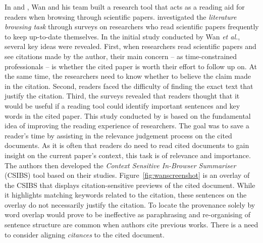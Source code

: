 In \cite{citation-sensitive} and \cite{csibs}, Wan and his team built a research tool that acts as a reading aid for readers when browsing through scientific papers.  investigated the \textit{literature browsing task} through surveys on researchers who read scientific papers frequently to keep up-to-date themselves. In the initial study conducted by Wan {\it et al.}, several key ideas were revealed. First, when researchers read scientific papers and see citations made by the author, their main concern -- as time-constrained professionals -- is whether the cited paper is worth their effort to follow up on. At the same time, the researchers need to know whether to believe the claim made in the citation. Second, readers faced the difficulty of finding the exact text that justify the citation. Third, the surveys revealed that readers thought that it would be  useful if a reading tool could identify important sentences and key words in the cited paper. This study conducted by  is based on the fundamental idea of improving the reading experience of researchers. The goal was to save a reader's time by assisting in the relevance judgement process on the cited documents. As it is often that readers do need to read cited documents to gain insight on the current paper's context, this task is of relevance and importance. The authors then developed the {\it Context Sensitive In-Browser Summariser} (CSIBS) tool based on their studies. Figure~\ref{fig:wanscreenshot} is an overlay of the CSIBS that displays citation-sensitive previews of the cited document. While it highlights matching keywords related to the citation, these sentences on the overlay do not necessarily justify the citation. To locate the provenance solely by word overlap would prove to be ineffective as paraphrasing and re-organising of sentence structure are common when authors cite previous works. There is a need to consider aligning \textit{citances} to the cited document.

